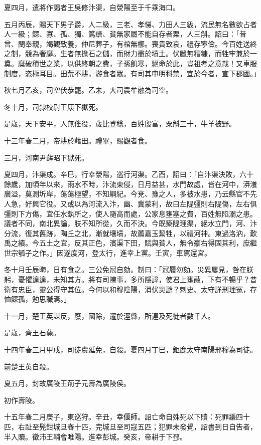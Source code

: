 \begin{pinyinscope}
夏四月，遣將作謁者王吳修汴渠，自滎陽至于千乘海口。

五月丙辰，賜天下男子爵，人二級，三老、孝悌、力田人三級，流民無名數欲占者人一級；鰥、寡、孤、獨、篤缮、貧無家屬不能自存者粟，人三斛。詔曰：「昔曾、閔奉親，竭觀致養，仲尼葬子，有棺無槨。喪貴致哀，禮存寧儉。今百姓送終之制，競為奢靡。生者無擔石之儲，而財力盡於墳土。伏臘無糟糠，而牲牢兼於一奠。糜破積世之業，以供終朝之費，子孫飢寒，絕命於此，豈祖考之意哉！又車服制度，恣極耳目。田荒不耕，游食者眾。有司其申明科禁，宜於今者，宣下郡國。」

秋七月乙亥，司空伏恭罷。乙未，大司農牟融為司空。

冬十月，司隸校尉王康下獄死。

是歲，天下安平，人無傜役，歲比登稔，百姓殷富，粟斛三十，牛羊被野。

十三年春二月，帝耕於藉田。禮畢，賜觀者食。

三月，河南尹薛昭下獄死。

夏四月，汴渠成。辛巳，行幸滎陽，巡行河渠。乙酉，詔曰：「自汴渠決敗，六十餘歲，加頃年以來，雨水不時，汴流東侵，日月益甚，水門故處，皆在河中，漭瀁廣溢，莫測圻岸，蕩蕩極望，不知綱紀。今兗、豫之人，多被水患，乃云縣官不先人急，好興它役。又或以為河流入汴，幽、冀蒙利，故曰左隄彊則右隄傷，左右俱彊則下方傷，宜任水埶所之，使人隨高而處，公家息壅塞之費，百姓無陷溺之患。議者不同，南北異論，朕不知所從，久而不決。今既築隄理渠，絕水立門，河、汴分流，復其舊跡，陶丘之北，漸就壤墳，故薦嘉玉絜牲，以禮河神。東過洛汭，歎禹之績。今五土之宜，反其正色，濱渠下田，賦與貧人，無令豪右得固其利，庶繼世宗瓠子之作。」因遂度河，登太行，進幸上黨。壬寅，車駕還宮。

冬十月壬辰晦，日有食之。三公免冠自劾。制曰：「冠履勿劾。災異屢見，咎在朕躬，憂懼遑遑，未知其方。將有司陳事，多所隱諱，使君上壅蔽，下有不暢乎？昔衛有忠臣，靈公得守其位。今何以和穆陰陽，消伏災譴？刺史、太守詳刑理冤，存恤鰥孤，勉思職焉。」

十一月，楚王英謀反，廢，國除，遷於涇縣，所連及死徙者數千人。

是歲，齊王石薨。

十四年春三月甲戌，司徒虞延免，自殺。夏四月丁巳，鉅鹿太守南陽邢穆為司徒。

前楚王英自殺。

夏五月，封故廣陵王荊子元壽為廣陵侯。

初作壽陵。

十五年春二月庚子，東巡狩。辛丑，幸偃師。詔亡命自殊死以下贖：死罪縑四十匹，右趾至髡鉗城旦舂十匹，完城旦至司寇五匹；犯罪未發覺，詔書到日自告者，半入贖。徵沛王輔會睢陽。進幸彭城。癸亥，帝耕于下邳。


\end{pinyinscope}
